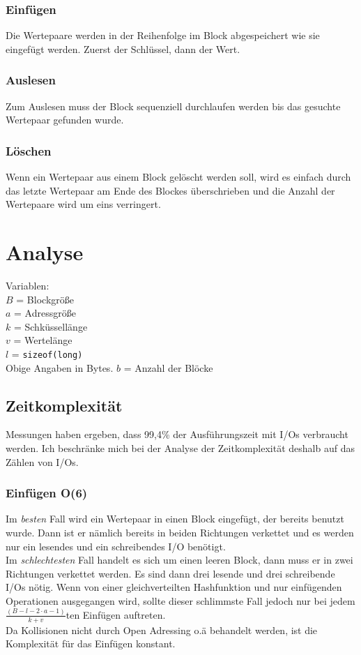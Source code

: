 \documentclass{article}
\begin{document}
\subsubsection{Einfügen}
Die Wertepaare werden in der Reihenfolge im Block abgespeichert wie sie
eingefügt werden. Zuerst der Schlüssel, dann der Wert.

\subsubsection{Auslesen}
Zum Auslesen muss der Block sequenziell durchlaufen werden bis das gesuchte
Wertepaar gefunden wurde.

\subsubsection{Löschen}
Wenn ein Wertepaar aus einem Block gelöscht werden soll, wird es einfach durch
das letzte Wertepaar am Ende des Blockes überschrieben und die Anzahl der
Wertepaare wird um eins verringert.\\

\section{Analyse}
Variablen:\\
$B$ = Blockgröße\\
$a$ = Adressgröße\\
$k$ = Schküssellänge\\
$v$ = Wertelänge\\
$l$ = \texttt{sizeof(long)}\\
Obige Angaben in Bytes.
$b$ = Anzahl der Blöcke\\

\subsection{Zeitkomplexität}
Messungen haben ergeben, dass 99,4\% der Ausführungszeit mit I/Os verbraucht
werden. Ich beschränke mich bei der Analyse der Zeitkomplexität deshalb auf das
Zählen von I/Os.

\subsubsection{Einfügen O(6)}
Im \emph{besten} Fall wird ein Wertepaar in einen Block eingefügt, der bereits
benutzt wurde. Dann ist er nämlich bereits in beiden Richtungen verkettet und es werden
nur ein lesendes und ein schreibendes I/O benötigt.\\
Im \emph{schlechtesten} Fall handelt es sich um einen leeren Block, dann muss er
in zwei Richtungen verkettet werden. Es sind dann drei lesende und drei schreibende
I/Os nötig. Wenn von einer gleichverteilten Hashfunktion und nur einfügenden
Operationen ausgegangen wird, sollte dieser schlimmste Fall jedoch nur bei jedem
$\frac{(B-l-2\cdot a -1)}{k+v}$ten Einfügen auftreten.\\
Da Kollisionen nicht durch Open Adressing o.ä behandelt werden, ist die
Komplexität für das Einfügen konstant.
\end{document}

